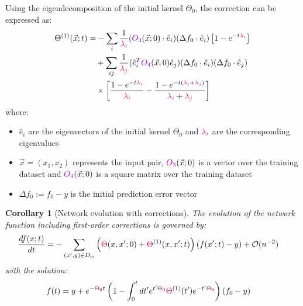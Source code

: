 \documentclass[a4paper]{article}
\theoremstyle{plain}
\newtheorem{corollary}[theorem]{Corollary}
\theoremstyle{definition}
\theoremstyle{remark}
\begin{document}
\begin{tcolorbox}[colback=theoremcolor!10,colframe=theoremcolor!60!black,title={\textbf{Theorem [Dyer] (Eigendecomposition of corrections)}},enhanced,drop shadow]\label{thm:eigen_corrections}
Using the eigendecomposition of the initial kernel $\Theta_0$, the correction can be expressed as:
\begin{align}
\Theta^{(1)}(\vec{x};t) &= -\sum_{i}\frac{1}{\textcolor{kernelcolor}{\lambda_{i}}}(\textcolor{k3color}{O_{3}}(\vec{x};0)\cdot\hat{e}_{i})(\Delta f_{0}\cdot\hat{e}_{i})\left[1-e^{-t\textcolor{kernelcolor}{\lambda_{i}}}\right] \nonumber\\
&\quad +\sum_{ij}\frac{1}{\textcolor{kernelcolor}{\lambda_{j}}}(\hat{e}_{i}^{T}\textcolor{k3color}{O_{4}}(\vec{x};0)\hat{e}_{j})(\Delta f_{0}\cdot \hat{e}_{i})(\Delta f_{0}\cdot \hat{e}_{j}) \nonumber\\
&\quad \times \left[\frac{1-e^{-t\textcolor{kernelcolor}{\lambda_{i}}}}{\textcolor{kernelcolor}{\lambda_{i}}}-\frac{1-e^{-t(\textcolor{kernelcolor}{\lambda_{i}}+\textcolor{kernelcolor}{\lambda_{j}})}}{\textcolor{kernelcolor}{\lambda_{i}}+\textcolor{kernelcolor}{\lambda_{j}}}\right] \label{eq:eigen_expansion}
\end{align}
where:
\begin{itemize}
\item $\hat{e}_{i}$ are the eigenvectors of the initial kernel $\Theta_{0}$ and $\textcolor{kernelcolor}{\lambda_{i}}$ are the corresponding eigenvalues
\item $\vec{x} = (x_1,x_2)$ represents the input pair, $\textcolor{k3color}{O_{3}}(\vec{x};0)$ is a vector over the training dataset and $\textcolor{k3color}{O_{4}}(\vec{x};0)$ is a square matrix over the training dataset
\item $\Delta f_{0} := f_{0} - y$ is the initial prediction error vector
\end{itemize}
\end{tcolorbox}

\begin{corollary}[Network evolution with corrections]\label{cor:network_evolution}
The evolution of the network function including first-order corrections is governed by:
\begin{align}
\frac{df(x;t)}{dt} &= -\sum_{(x',y)\in D_{\rm tr}}\left(\textcolor{purple}{\Theta}(x,x';0)+\textcolor{purple}{\Theta}^{(1)}(x,x';t)\right)\left(f(x';t)-y\right) + \mathcal{O}(n^{-2}) \label{eq:evolution_ode}
\end{align}
with the solution:
\begin{align}
f(t) &= y + e^{-\textcolor{purple}{\Theta}_{0}t}\left(1-\int_{0}^{t}dt'e^{t'\textcolor{purple}{\Theta}_{0}}\textcolor{purple}{\Theta}^{(1)}(t')e^{-t'\textcolor{purple}{\Theta}_{0}}\right)\left(f_{0}-y\right) \label{eq:evolution_solution}
\end{align}
\end{corollary}
\end{document}
